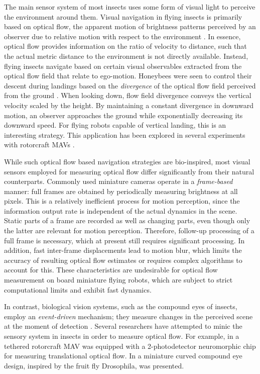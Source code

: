 The main sensor system of most insects uses some form of visual light to perceive the environment around them. Visual navigation in flying insects is primarily based on optical flow, the apparent motion of brightness patterns perceived by an observer due to relative motion with respect to the environment \cite{Gibson1979}. In essence, optical flow provides information on the ratio of velocity to distance, such that the actual metric distance to the environment is not directly available. Instead, flying insects navigate based on certain visual observables extracted from the optical flow field that relate to ego-motion. Honeybees were seen to control their descent during landings based on the \emph{divergence} of the optical flow field perceived from the ground \cite{Baird2013}. When looking down, flow field divergence conveys the vertical velocity scaled by the height. By maintaining a constant divergence in downward motion, an observer approaches the ground while exponentially decreasing its downward speed. For flying robots capable of vertical landing, this is an interesting strategy. This application has been explored in several experiments with rotorcraft MAVs \cite{Herisse2008,Herisse2012,Ho2016,DeCroon2016}.

While such optical flow based navigation strategies are bio-inspired, most visual sensors employed for measuring optical flow differ significantly from their natural counterparts. Commonly used miniature cameras operate in a \emph{frame-based} manner: full frames are obtained by periodically measuring brightness at all pixels. This is a relatively inefficient process for motion perception, since the information output rate is independent of the actual dynamics in the scene. Static parts of a frame are recorded as well as changing parts, even though only the latter are relevant for motion perception. Therefore, follow-up processing of a full frame is necessary, which at present still requires significant processing. In addition, fast inter-frame displacements lead to motion blur, which limits the accuracy of resulting optical flow estimates or requires complex algorithms to account for this. These characteristics are undesirable for optical flow measurement on board miniature flying robots, which are subject to strict computational limits and exhibit fast dynamics. 

In contrast, biological vision systems, such as the compound eyes of insects, employ an \emph{event-driven} mechanism; they measure changes in the perceived scene at the moment of detection \cite{Linares-barranco2014}. Several researchers have attempted to minic the sensory system in insects in order to measure optical flow. For example, in \citet{Ruffier2014} a tethered rotorcraft MAV was equipped with a 2-photodetector neuromorphic chip for measuring translational optical flow. In \citet{Floreano2013} a miniature curved compound eye design, inspired by the fruit fly Drosophila, was presented.

